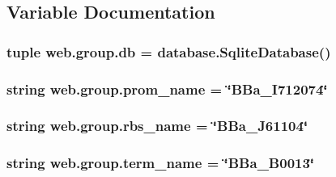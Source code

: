 \subsection{Variable Documentation}
\hypertarget{namespaceweb_1_1group_acb4e17b433fac74d5699b5b4ee01d036}{
\subsubsection[{db}]{\setlength{\rightskip}{0pt plus 5cm}tuple web.\-group.\-db = {\bf database.\-Sqlite\-Database}()}}\label{namespaceweb_1_1group_acb4e17b433fac74d5699b5b4ee01d036}
\hypertarget{namespaceweb_1_1group_a2d4e041add204b6a4bc280893ec2f091}{
\subsubsection[{prom\-\_\-name}]{\setlength{\rightskip}{0pt plus 5cm}string web.\-group.\-prom\-\_\-name = \char`\"{}B\-Ba\-\_\-\-I712074\char`\"{}}}\label{namespaceweb_1_1group_a2d4e041add204b6a4bc280893ec2f091}
\hypertarget{namespaceweb_1_1group_af78f4e7baaf9e690622dc788a928801d}{
\subsubsection[{rbs\-\_\-name}]{\setlength{\rightskip}{0pt plus 5cm}string web.\-group.\-rbs\-\_\-name = \char`\"{}B\-Ba\-\_\-\-J61104\char`\"{}}}\label{namespaceweb_1_1group_af78f4e7baaf9e690622dc788a928801d}
\hypertarget{namespaceweb_1_1group_ac7d21ec85fbfdd177c9373dbd440cc72}{
\subsubsection[{term\-\_\-name}]{\setlength{\rightskip}{0pt plus 5cm}string web.\-group.\-term\-\_\-name = \char`\"{}B\-Ba\-\_\-\-B0013\char`\"{}}}\label{namespaceweb_1_1group_ac7d21ec85fbfdd177c9373dbd440cc72}
